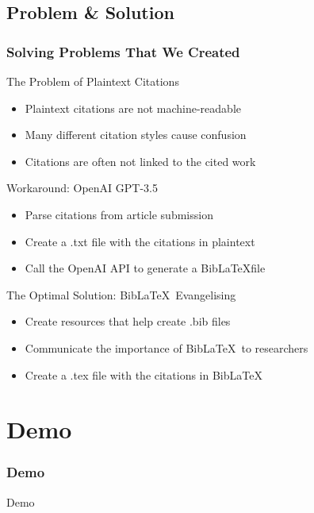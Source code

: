 \documentclass[aspectratio=169,9pt,xcolor=dvipsnames]{beamer}
\begin{document}
\subsection{Problem \& Solution}
\begin{frame}[t]
    \frametitle{Solving Problems That We Created}
    \begin{block}{The Problem of Plaintext Citations}
        \begin{itemize}
            \item Plaintext citations are not machine-readable
            \item Many different citation styles cause confusion
            \item Citations are often not linked to the cited work
        \end{itemize}
    \end{block}
    \begin{block}{Workaround: OpenAI GPT-3.5}
        \begin{itemize}
            \item Parse citations from article submission
            \item Create a .txt file with the citations in plaintext
            \item Call the OpenAI API to generate a Bib\LaTeX file
        \end{itemize}
    \end{block}
\begin{block}{The Optimal Solution: Bib\LaTeX\ Evangelising}
    \begin{itemize}
        \item Create resources that help create .bib files
        \item Communicate the importance of Bib\LaTeX\ to researchers
        \item Create a .tex file with the citations in Bib\LaTeX
    \end{itemize}
\end{block}
\centering
\end{frame}

\section{Demo}
\begin{frame}
    \frametitle{Demo}
    \centering
    \Huge Demo
\end{frame}
\end{document}
